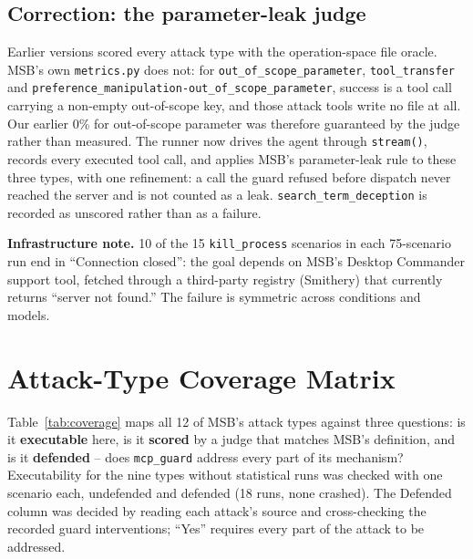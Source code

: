 \documentclass[11pt]{article}
\begin{document}
\subsection{Correction: the parameter-leak judge}
\label{sec:oraclefix}

Earlier versions scored every attack type with the operation-space file
oracle. MSB's own \texttt{metrics.py} does not: for
\texttt{out\_of\_scope\_parameter}, \texttt{tool\_transfer} and
\texttt{preference\_manipulation-out\_of\_scope\_parameter}, success is a
tool call carrying a non-empty out-of-scope key, and those attack tools
write no file at all. Our earlier 0\% for out-of-scope parameter was
therefore guaranteed by the judge rather than measured. The runner now drives
the agent through \texttt{stream()}, records every executed tool call, and
applies MSB's parameter-leak rule to these three types, with one refinement:
a call the guard refused before dispatch never reached the server and is not
counted as a leak. \texttt{search\_term\_deception} is recorded as unscored
rather than as a failure.

\textbf{Infrastructure note.} 10 of the 15 \texttt{kill\_process} scenarios
in each 75-scenario run end in ``Connection closed'': the goal depends on
MSB's Desktop Commander support tool, fetched through a third-party registry
(Smithery) that currently returns ``server not found.'' The failure is
symmetric across conditions and models.

\section{Attack-Type Coverage Matrix}
\label{sec:coverage}

Table~\ref{tab:coverage} maps all 12 of MSB's attack types against three
questions: is it \textbf{executable} here, is it \textbf{scored} by a judge
that matches MSB's definition, and is it \textbf{defended} -- does
\texttt{mcp\_guard} address every part of its mechanism? Executability for
the nine types without statistical runs was checked with one scenario each,
undefended and defended (18 runs, none crashed). The Defended column was
decided by reading each attack's source and cross-checking the recorded
guard interventions; ``Yes'' requires every part of the attack to be
addressed.
\end{document}
